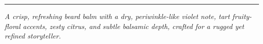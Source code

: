 \documentclass{article}
\begin{document}
\vspace{1cm}
\begin{center}
\textcolor{violetPurple}{\rule{0.8\textwidth}{0.4pt}}
\end{center}

\begin{center}
\textit{\textcolor{colaDark}{A crisp, refreshing beard balm with a dry, periwinkle-like violet note, tart fruity-floral accents, zesty citrus, and subtle balsamic depth, crafted for a rugged yet refined storyteller.}}
\end{center}
\end{document}
